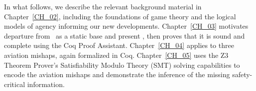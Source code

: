  

In what follows, we describe the relevant background material in Chapter~\ref{CH_02}, including the foundations of game theory and the logical models of agency informing our new developments. Chapter~\ref{CH_03} motivates departure from \SFive\ as a static base and present \DASL, then proves that it is sound and complete using the Coq Proof Assistant. Chapter~\ref{CH_04} applies \DASL to three aviation mishaps, again formalized in Coq. Chapter~\ref{CH_05} uses the Z3 Theorem Prover's Satisfiability Modulo Theory (SMT) solving capabilities to encode the aviation mishaps and demonstrate the inference of the missing safety-critical information.